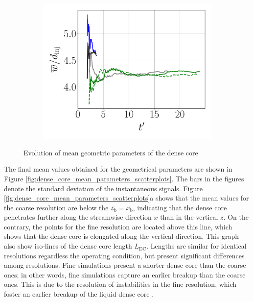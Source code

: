 \begin{figure}[ht]
\hfill
\begin{subfigure}[b]{0.3\textwidth}
	\flushleft
   \includegraphics[scale=0.225]{./part2_developments/figures_ch5_resolved_JICF/results_dense_core_modeling/convergence_mean_width}
\end{subfigure}
	\vspace*{-0.2in}
   \caption{Evolution of mean geometric parameters of the dense core}
\label{fig:dense_core_mean_parameters_convergence}
\end{figure}

The final mean values obtained for the geometrical parameters are shown in Figure \ref{fig:dense_core_mean_parameters_scatterplots}. The bars in the figures denote the standard deviation of the instantaneous signals. Figure \ref{fig:dense_core_mean_parameters_scatterplots}a shows that the mean values for the coarse resolution are below the $\overline{z_\mathrm{b}} = \overline{x_\mathrm{b}}$, indicating that the dense core penetrates further along the streamwise direction $x$ than in the vertical $z$. On the contrary, the points for the fine resolution are located above this line, which shows that the dense core is elongated along the vertical direction. This graph also show iso-lines of the dense core length $L_\mathrm{DC}$. Lengths are similar for identical resolutions regardless the operating condition, but present significant differences among resolutions. Fine simulations present a shorter dense core than the coarse ones; in other words, fine simulations capture an earlier breakup than the coarse ones. This is due to the resolution of instabilities in the fine resolution, which foster an earlier breakup of the liquid dense core .

